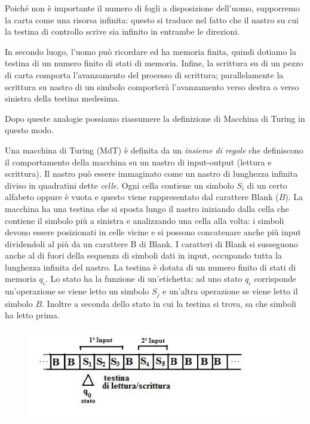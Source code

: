 Poich\'e non \`e importante il numero di fogli a disposizione dell'uomo,
supporremo la carta come una risorsa infinita: questo si traduce nel fatto che
il nastro su cui la testina di controllo scrive sia infinito in entrambe le
direzioni.

In secondo luogo, l'uomo pu\`o ricordare ed ha memoria finita, quindi dotiamo la
testina di un numero finito di stati di memoria. Infine, la scrittura su di un
pezzo di carta comporta l'avanzamento del processo di scrittura; parallelamente
la scrittura su nastro di un simbolo comporter\`a l'avanzamento verso destra o
verso sinistra della testina medesima.

Dopo queste analogie possiamo riassumere la definizione di Macchina di Turing in
questo modo.

Una macchina di Turing (MdT) \`e definita da un \textsl{insieme di
  regole} che definiscono il comportamento della macchina su un nastro
di input-output (lettura e scrittura). Il nastro pu\`o essere
immaginato come un nastro di lunghezza infinita diviso in quadratini
dette \textsl{celle}. Ogni cella contiene un simbolo $S_i$ di un certo
alfabeto oppure \`e vuota e questo viene rappresentato dal carattere
Blank ($B$). La macchina ha una testina che si sposta lungo il nastro
iniziando dalla cella che contiene il simbolo pi\`u a sinistra e
analizzando una cella alla volta: i simboli devono essere posizionati
in celle vicine e si possono concatenare anche pi\`u input dividendoli
al pi\`u da un carattere B di Blank. I caratteri di Blank si
susseguono anche al di fuori della sequenza di simboli dati in input,
occupando tutta la lunghezza infinita del nastro.  La testina \`e
dotata di un numero finito di stati di memoria $q_i$. Lo stato ha la
funzione di un'etichetta: ad uno stato $q_i$ corrisponde un'operazione
se viene letto un simbolo $S_j$ e un'altra operazione se viene letto
il simbolo $B$. Inoltre a seconda dello stato in cui la testina si
trova, sa che simboli ha letto prima.

\begin{figure}[htbp!]
\centering
\includegraphics[scale=0.8]{Nastro.jpg}
\end{figure}

